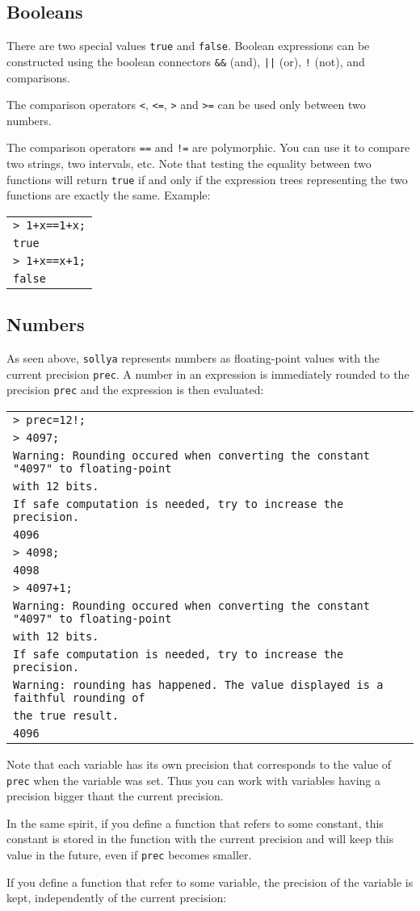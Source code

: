 \documentclass[a4paper]{article}
\newcommand{\com}[1]{\texttt{#1}}
\newcommand{\key}[1]{\texttt{#1}}
\newcommand{\sollya}{\texttt{sollya}\xspace}
\newcommand{\code}[1]{\begin{center}
\begin{tabular}{|p{14.8cm}|}
\hline
#1
\hline
\end{tabular}
\end{center}
}
\newcommand{\ligne}[1]{\texttt{#1}\\}
\begin{document}
\subsection{Booleans}
There are two special values \key{true} and \key{false}. Boolean expressions can be constructed using the boolean connectors \key{\&\&} (and), \key{||} (or), \key{!} (not), and comparisons.

The comparison operators \key{<}, \key{<=}, \key{>} and \key{>=} can be used only between two numbers.

The comparison operators \key{==} and \key{!=} are polymorphic. You can use it to compare two strings, two intervals, etc. Note that testing the equality between two functions will return \key{true} if and only if the expression trees representing the two functions are exactly the same. Example:

\code{
\ligne{> 1+x==1+x;}
\ligne{true}
\ligne{> 1+x==x+1;}
\ligne{false}
}

\subsection{Numbers}
As seen above, \sollya represents numbers as floating-point values with the current precision \com{prec}. A number in an expression is immediately rounded to the precision \com{prec} and the expression is then evaluated:

\code{
\ligne{> prec=12!;}
\ligne{> 4097;}
\ligne{Warning: Rounding occured when converting the constant "4097" to floating-point}
\ligne{with 12 bits.}
\ligne{If safe computation is needed, try to increase the precision.}
\ligne{4096}
\ligne{> 4098;}
\ligne{4098}
\ligne{> 4097+1;}
\ligne{Warning: Rounding occured when converting the constant "4097" to floating-point}
\ligne{with 12 bits.}
\ligne{If safe computation is needed, try to increase the precision.}
\ligne{Warning: rounding has happened. The value displayed is a faithful rounding of}
\ligne{the true result.}
\ligne{4096}
}

Note that each variable has its own precision that corresponds to the value of \com{prec} when the variable was set. Thus you can work with variables having a precision bigger thant the current precision.

In the same spirit, if you define a function that refers to some constant, this constant is stored in the function with the current precision and will keep this value in the future, even if \com{prec} becomes smaller.

If you define a function that refer to some variable, the precision of the variable is kept, independently of the current precision:
\end{document}
